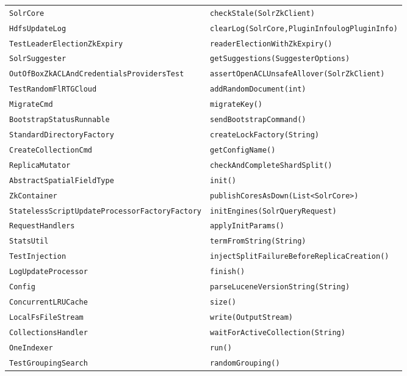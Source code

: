 \begin{center}
\begin{longtable}{ll}
 \lstinline/SolrCore/&{\lstinline/checkStale(SolrZkClient)/}\\
 \lstinline/HdfsUpdateLog/&{\lstinline/clearLog(SolrCore,PluginInfoulogPluginInfo)/}\\
 \lstinline/TestLeaderElectionZkExpiry/&{\lstinline/readerElectionWithZkExpiry()/}\\
 \lstinline/SolrSuggester/&{\lstinline/getSuggestions(SuggesterOptions)/}\\
 \lstinline/OutOfBoxZkACLAndCredentialsProvidersTest/&{\lstinline/assertOpenACLUnsafeAllover(SolrZkClient)/}\\
 \lstinline/TestRandomFlRTGCloud/&{\lstinline/addRandomDocument(int)/}\\
 \lstinline/MigrateCmd/&{\lstinline/migrateKey()/}\\
 \lstinline/BootstrapStatusRunnable/&{\lstinline/sendBootstrapCommand()/}\\
 \lstinline/StandardDirectoryFactory/&{\lstinline/createLockFactory(String)/}\\
 \lstinline/CreateCollectionCmd/&{\lstinline/getConfigName()/}\\
 \lstinline/ReplicaMutator/&{\lstinline/checkAndCompleteShardSplit()/}\\
 \lstinline/AbstractSpatialFieldType/&{\lstinline/init()/}\\
 \lstinline/ZkContainer/&{\lstinline/publishCoresAsDown(List<SolrCore>)/}\\
 \lstinline/StatelessScriptUpdateProcessorFactoryFactory/&{\lstinline/initEngines(SolrQueryRequest)/}\\
 \lstinline/RequestHandlers/&{\lstinline/applyInitParams()/}\\
 \lstinline/StatsUtil/&{\lstinline/termFromString(String)/}\\
 \lstinline/TestInjection/&{\lstinline/injectSplitFailureBeforeReplicaCreation()/}\\
 \lstinline/LogUpdateProcessor/&{\lstinline/finish()/}\\
 \lstinline/Config/&{\lstinline/parseLuceneVersionString(String)/}\\
 \lstinline/ConcurrentLRUCache/&{\lstinline/size()/}\\
 \lstinline/LocalFsFileStream/&{\lstinline/write(OutputStream)/}\\
\lstinline/CollectionsHandler/&{\lstinline/waitForActiveCollection(String)/}\\
 \lstinline/OneIndexer/&{\lstinline/run()/}\\
 \lstinline/TestGroupingSearch/&{\lstinline/randomGrouping()/}\\

\end{longtable}
\end{center}
